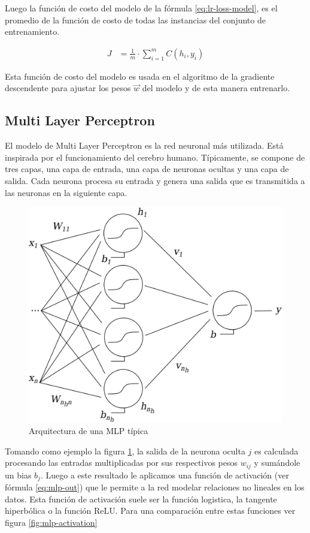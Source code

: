 Luego la función de costo del modelo de la fórmula \ref{eq:lr-loss-model}, es el promedio de la función de costo de todas las instancias del conjunto de entrenamiento.

\begin{equation}
	\label{eq:lr-loss-model}
\begin{split}
	J &= \frac{1}{m} \cdot \sum_{i=1}^{m} {C(h_i, y_i)}
\end{split}
\end{equation}

Esta función de costo del modelo es usada en el algoritmo de la gradiente descendente para ajustar los pesos $\vec{w}$ del modelo y de esta manera entrenarlo.

\subsection{Multi Layer Perceptron}

El modelo de Multi Layer Perceptron es la red neuronal más utilizada. Está inspirada por el funcionamiento del cerebro humano. Típicamente, se compone de tres capas, una capa de entrada, una capa de neuronas ocultas y una capa de salida. Cada neurona procesa su entrada y genera una salida que es transmitida a las neuronas en la siguiente capa.

\begin{figure}[htbp]
	\centering
	\includegraphics[width=0.6\linewidth]{graficos/propios/mlp.png}
	\caption{Arquitectura de una MLP típica \citep{bouzgou2012advanced}}
	\label{fig:mlp-eg}
\end{figure}

Tomando como ejemplo la figura \ref{fig:mlp-eg}, la salida de la neurona oculta $j$ es calculada procesando las entradas multiplicadas por sus respectivos pesos $w_{ij}$ y sumándole un bias $b_j$. Luego a este resultado le aplicamos una función de activación (ver fórmula \ref{eq:mlp-out}) que le permite a la red modelar relaciones no lineales en los datos. Esta función de activación suele ser la función logistica, la tangente hiperbólica o la función \ac{ReLU}. Para una comparación entre estas funciones ver figura \ref{fig:mlp-activation}

